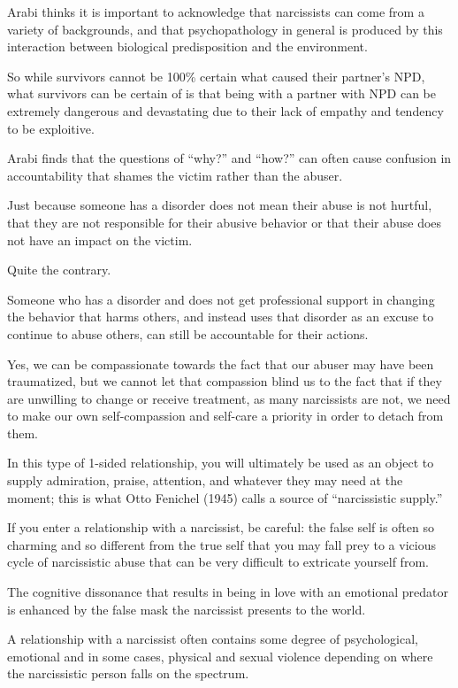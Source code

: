 \documentclass[oneside]{book}
\numberwithin{equation}{section}
\begin{document}
Arabi thinks it is important to acknowledge that narcissists can come from a variety of backgrounds, and that psychopathology in general is produced by this interaction between biological predisposition and the environment.

%
So while survivors cannot be 100\% certain what caused their partner's NPD, what survivors can be certain of is that being with a partner with NPD can be extremely dangerous and devastating due to their lack of empathy and tendency to be exploitive.

Arabi finds that the questions of ``why?'' and ``how?'' can often cause confusion in accountability that shames the victim rather than the abuser.

Just because someone has a disorder does not mean their abuse is not hurtful, that they are not responsible for their abusive behavior or that their abuse does not have an impact on the victim.

Quite the contrary.

Someone who has a disorder and does not get professional support in changing the behavior that harms others, and instead uses that disorder as an excuse to continue to abuse others, can still be accountable for their actions.

Yes, we can be compassionate towards the fact that our abuser may have been traumatized, but we cannot let that compassion blind us to the fact that if they are unwilling to change or receive treatment, as many narcissists are not, we need to make our own self-compassion and self-care a priority in order to detach from them.

%
In this type of 1-sided relationship, you will ultimately be used as an object to supply admiration, praise, attention, and whatever they may need at the moment; this is what Otto Fenichel (1945) calls a source of ``narcissistic supply.''

If you enter a relationship with a narcissist, be careful: the false self is often so charming and so different from the true self that you may fall prey to a vicious cycle of narcissistic abuse that can be very difficult to extricate yourself from.

The cognitive dissonance that results in being in love with an emotional predator is enhanced by the false mask the narcissist presents to the world.

A relationship with a narcissist often contains some degree of psychological, emotional and in some cases, physical and sexual violence depending on where the narcissistic person falls on the spectrum.
\end{document}
